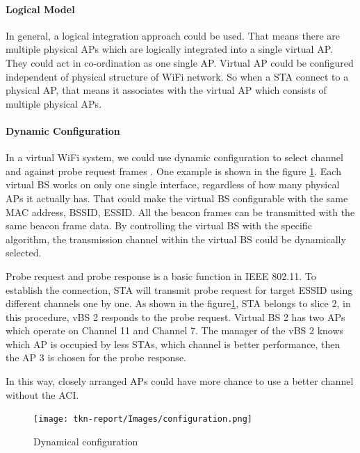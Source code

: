 \documentclass{IEEEtran}
\begin{document}
\paragraph{Logical Model}
In general, a logical integration approach could be used. That means there are multiple physical APs which are logically integrated into a single virtual AP. They could act in co-ordination as one single AP. Virtual AP could be configured independent of physical structure of WiFi network. So when a STA connect to a physical AP, that means it associates with the virtual AP which consists of multiple physical APs.

\paragraph{Dynamic Configuration}
In a virtual WiFi system, we could use dynamic configuration to select channel and against probe request frames \cite{Nakauchi2014}. One example is shown in the figure \ref{configuration}. Each virtual BS works on only one single interface, regardless of how many physical APs it actually has. That could make the virtual BS configurable with the same MAC address, BSSID, ESSID. All the beacon frames can be transmitted with the same beacon frame data. By controlling the virtual BS with the specific algorithm, the transmission channel within the virtual BS could be dynamically selected.

Probe request and probe response is a basic function in IEEE 802.11. To establish the connection, STA will transmit probe request for target ESSID using different channels one by one. As shown in the figure\ref{configuration}, STA belongs to slice 2, in this procedure, vBS 2 responds to the probe request. Virtual BS 2 has two APs which operate on Channel 11 and Channel 7. The manager of the vBS 2 knows which AP is occupied by less STAs, which channel is better performance, then the AP 3 is chosen for the  probe response.

In this way, closely arranged APs could have more chance to use a better channel without the ACI.


\graphicspath{{Images/}}
\maketitle
\begin{figure}[htp]
\centering
\texttt{[image: tkn-report/Images/configuration.png]}
\caption{Dynamical configuration}
\label{configuration}
\end{figure}
\end{document}
